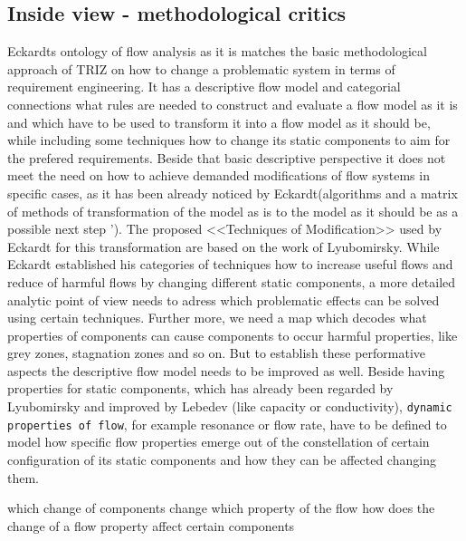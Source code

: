\documentclass[a4paper,11pt]{article}
\begin{document}
\begin{itemize}
        \subsection{Inside view - methodological critics}
        Eckardts ontology of flow analysis as it is matches the basic methodological approach of TRIZ on how to change a problematic system in terms 
        of requirement engineering. It has a descriptive flow model and categorial connections what rules are needed to construct and evaluate a 
        flow model as it is and which have to be used to transform it into a flow model as it should be, while including some techniques how to change
        its static components to aim for the prefered requirements. Beside that basic descriptive perspective it does not meet the need on how
        to achieve demanded modifications of flow systems in specific cases, as it has been already noticed by Eckardt(algorithms and a matrix
        of methods of transformation of the model as is to the model as it should be as a possible next step \cite{Eckardt2020}').
        The proposed <<Techniques of Modification>> used by Eckardt for this transformation are based on the work of Lyubomirsky. While Eckardt established
        his categories of techniques how to increase useful flows and reduce of harmful flows by changing different static components, a more detailed analytic 
        point of view needs to adress which problematic effects can be solved using certain techniques. Further more, we need a map which decodes what
        properties of components can cause components to occur harmful properties, like grey zones, stagnation zones and so on. 
        But to establish these performative aspects the descriptive flow model needs to be improved as well. 
        Beside having properties for static components, which has already been regarded by Lyubomirsky and improved by Lebedev (like capacity or conductivity),
        \texttt{dynamic properties of flow}, for example resonance or flow rate, have to be
        defined to model how specific flow properties emerge out of the constellation of certain configuration of its static components and how they can be affected
        changing them.

        which change of components change which property of the flow
        how does the change of a flow property affect certain components
        

\end{itemize}
\end{document}
